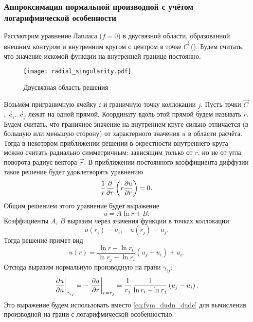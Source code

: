 \subsubsection{Аппроксимация нормальной производной с учётом логарифмической особенности}
\label{sec:fvm_log_singularity}
Рассмотрим уравнение Лапласа ($f=0$) в двусвязной области, образованной
внешним контуром и внутренним кругом с центром в точке $\vec C$ ().
Будем считать, что значение искомой функции на внутренней границе постоянно.
\begin{figure}[h!]
\centering
\texttt{[image: radial\_singularity.pdf]}
\caption{Двусвязная область решения}
\label{fig:radial_singularity}
\end{figure}

Возьмём приграничную ячейку $i$ и граничную точку коллокации $j$.
Пусть точки $\vec C$, $\vec c_i$, $\vec c_j$ лежат на одной прямой. Координату
вдоль этой прямой будем называть $r$.
Будем считать, что граничное значение на внутреннем круге
сильно отличается (в большую или меньшую сторону) от
характерного значения $u$ в области расчёта.
Тогда в некотором приближении
решении в окрестности внутреннего круга можно
считать радиально симметричным: зависящим
только от $r$, но не от угла поворота радиус-вектора $\vec r$.
В приближении постоянного коэффициента диффузии такое решение будет удовлетворять уравнению 
\begin{equation*}
\frac 1r \frac{\partial }{\partial r}\left( r \frac{\partial u}{\partial r} \right) = 0.
\end{equation*}
Общим решением этого уравнение будет выражение
\begin{equation*}
u = A \ln r + B.
\end{equation*}
Коэффициенты $A$, $B$ выразим через значения
функции в точках коллокации:
\begin{equation*}
u(r_i) = u_i, \quad u(r_j) = u_j.
\end{equation*}
Тогда решение примет вид
\begin{equation*}
u(r) = \frac{\ln r - \ln r_i}{\ln r_j - \ln r_i}\left(u_j - u_i\right) + u_i.
\end{equation*}
Отсюда выразим нормальную производную на грани $\gamma_{ij}$:
\begin{equation} 
\label{eq:fvm_dudn_radial}
\left.\frac{\partial u}{\partial n}\right|_{\gamma_{ij}} = -\left.\frac{\partial u}{\partial r}\right|_{r=r_j} =  
\frac {1} {r_j} \, \frac{1}{\ln r_i - \ln r_j}\left(u_j - u_i\right).
\end{equation}
Это выражение будем использовать вместо
\cref{eq:fvm_dudn_dudc} для вычисления производной
на грани с логарифмической особенностью.

